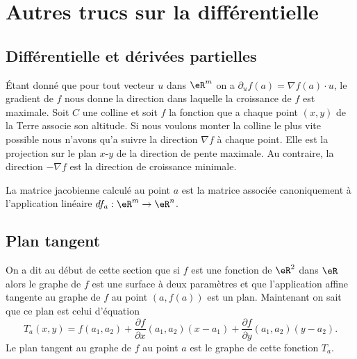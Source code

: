 \section{Autres trucs sur la différentielle}

\subsection{Différentielle et dérivées partielles}

Étant donné que pour tout vecteur \( u\) dans \( \eR^m\) on a \( \partial_uf(a)=\nabla f(a)\cdot u\), le gradient de \( f\) nous donne la direction dans laquelle la croissance de \( f\) est maximale. Soit \( C\) une colline et soit \( f\) la fonction que a chaque point \( (x,y)\) de la Terre associe son altitude. Si nous voulons monter la colline le plus vite possible nous n'avons qu'a suivre la direction \( \nabla f\) à chaque point. Elle est la projection sur le plan \( x\)-\( y\) de la direction de pente maximale. Au contraire, la direction \( -\nabla f\) est la direction de croissance minimale.

La matrice jacobienne calculé au point \( a\) est la matrice associée canoniquement à l'application linéaire \( df_a:\eR^m\to\eR^n\).

\subsection{Plan tangent}

On a dit au début de cette section que si \( f\) est une fonction de \( \eR^2\) dans \( \eR\) alors le graphe de \( f\) est une surface à deux paramètres et que l'application affine tangente au graphe de \( f\) au point \( (a, f(a))\) est un plan. Maintenant on sait que ce plan est celui d'équation
\begin{equation}
	T_a(x,y)=f(a_1,a_2)+\frac{ \partial f }{ \partial x }(a_1,a_2)(x-a_1)+\frac{ \partial f }{ \partial y }(a_1,a_2)(y-a_2).
\end{equation}
Le plan tangent au graphe de \( f\) au point \( a\) est le graphe de cette fonction \( T_a\).


